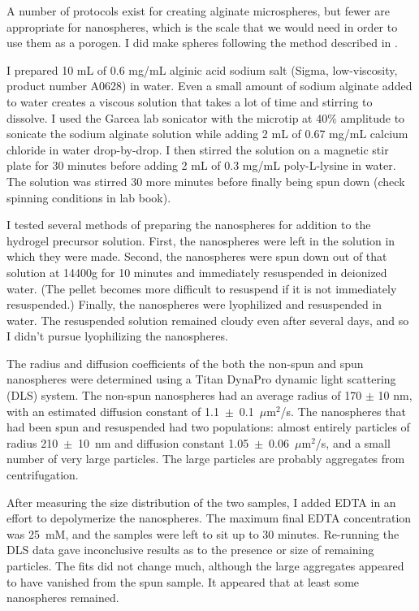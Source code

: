 A number of protocols exist for creating alginate microspheres, but fewer are appropriate for nanospheres, which is the scale that we would need in order to use them as a porogen.  I did make spheres following the method described in \cite{de03}.

I prepared 10 mL of 0.6 mg/mL alginic acid sodium salt (Sigma, low-viscosity, product number A0628) in water.  Even a small amount of sodium alginate added to water creates a viscous solution that takes a lot of time and stirring to dissolve.  I used the Garcea lab sonicator with the microtip at 40\% amplitude to sonicate the sodium alginate solution while adding 2 mL of 0.67 mg/mL calcium chloride in water drop-by-drop.  I then stirred the solution on a magnetic stir plate for 30 minutes before adding 2 mL of 0.3 mg/mL poly-L-lysine in water.  The solution was stirred 30 more minutes before finally being spun down (check spinning conditions in lab book).

I tested several methods of preparing the nanospheres for addition to the hydrogel precursor solution.  First, the nanospheres were left in the solution in which they were made.  Second, the nanospheres were spun down out of that solution at 14400g for 10 minutes and immediately resuspended in deionized water.  (The pellet becomes more difficult to resuspend if it is not immediately resuspended.) Finally, the nanospheres were lyophilized and resuspended in water.  The resuspended solution remained cloudy even after several days, and so I didn't pursue lyophilizing the nanospheres.

The radius and diffusion coefficients of the both the non-spun and spun nanospheres were determined using a Titan DynaPro dynamic light scattering (DLS) system.  The non-spun nanospheres had an average radius of 170 $\pm$ 10 nm, with an estimated diffusion constant of 1.1~$\pm$~0.1~$\mu$m$^2$/s.  The nanospheres that had been spun and resuspended had two populations: almost entirely particles of radius 210~$\pm$~10~nm and diffusion constant 1.05~$\pm$~0.06~$\mu$m$^2$/s, and a small number of very large particles.  The large particles are probably aggregates from centrifugation.

After measuring the size distribution of the two samples, I added EDTA in an effort to depolymerize the nanospheres.  The maximum final EDTA concentration was 25~mM, and the samples were left to sit up to 30 minutes.  Re-running the DLS data gave inconclusive results as to the presence or size of remaining particles.  The fits did not change much, although the large aggregates appeared to have vanished from the spun sample.  It appeared that at least some nanospheres remained.

